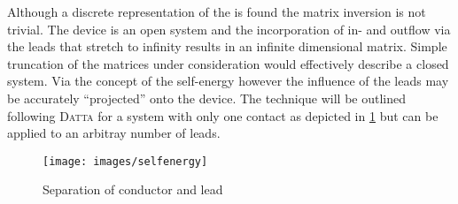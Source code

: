 Although a discrete representation of the \hamil{} is found the matrix inversion is not trivial. The device is an open system and the incorporation of in- and outflow via the leads that stretch to infinity results in an infinite dimensional matrix.
Simple truncation of the matrices under consideration would effectively describe a closed system. Via the concept of the self-energy however the influence of the leads may be accurately ``projected'' onto the device.
The technique will be outlined following \textsc{Datta} for a system with only one contact as depicted in \cref{fig:selfenergy} but can be applied to an arbitray number of leads. \begin{figure}[h!]
\centering
\texttt{[image: images/selfenergy]}
\caption{Separation of conductor and lead}
\label{fig:selfenergy}
\end{figure}
